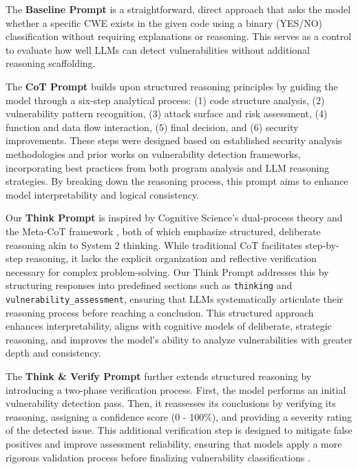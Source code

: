 \documentclass[sigconf]{acmart}
\begin{document}
The \textbf{Baseline Prompt} is a straightforward, direct approach that asks the model whether a specific CWE exists in the given code using a binary (YES/NO) classification without requiring explanations or reasoning. This serves as a control to evaluate how well LLMs can detect vulnerabilities without additional reasoning scaffolding.

The \textbf{CoT Prompt} \cite{wei2022chain, zhang2022automatic} builds upon structured reasoning principles by guiding the model through a six-step analytical process: (1) code structure analysis, (2) vulnerability pattern recognition, (3) attack surface and risk assessment, (4) function and data flow interaction, (5) final decision, and (6) security improvements. These steps were designed based on established security analysis methodologies and prior works on vulnerability detection frameworks, incorporating best practices from both program analysis and LLM reasoning strategies. By breaking down the reasoning process, this prompt aims to enhance model interpretability and logical consistency.

Our \textbf{Think Prompt} is inspired by Cognitive Science’s dual-process theory \cite{kahneman2011thinking, evans2008dual} and the Meta-CoT framework \cite{xiang2025towards}, both of which emphasize structured, deliberate reasoning akin to System 2 thinking. While traditional CoT facilitates step-by-step reasoning, it lacks the explicit organization and reflective verification necessary for complex problem-solving. Our Think Prompt addresses this by structuring responses into predefined sections such as \texttt{thinking} and \texttt{vulnerability\_assessment}, ensuring that LLMs systematically articulate their reasoning process before reaching a conclusion. This structured approach enhances interpretability, aligns with cognitive models of deliberate, strategic reasoning, and improves the model’s ability to analyze vulnerabilities with greater depth and consistency.


The \textbf{Think \& Verify Prompt} further extends structured reasoning by introducing a two-phase verification process. First, the model performs an initial vulnerability detection pass. Then, it reassesses its conclusions by verifying its reasoning, assigning a confidence score (0 - 100\%), and providing a severity rating of the detected issue. This additional verification step is designed to mitigate false positives and improve assessment reliability, ensuring that models apply a more rigorous validation process before finalizing vulnerability classifications \cite{xiang2025towards}.
\end{document}
